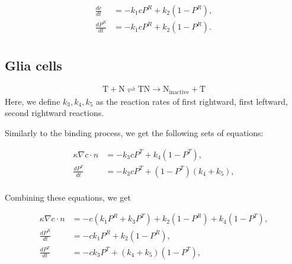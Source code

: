 \documentclass[11pt, a4paper]{article}\usepackage[]{graphicx}\usepackage[]{color}
\begin{document}
\begin{align*}
\frac{dc}{dt} &= -k_1cP^R + k_2(1-P^R),\\
\frac{dP^R}{dt} &= -k_1cP^R + k_2(1-P^R).\\
\end{align*}


\subsection{Glia cells}


\begin{align*}
\text{T} + \text{N} \rightleftharpoons \text{TN} \rightarrow \text{N}_{\text{inactive}} + \text{T}
\end{align*}
Here, we define $k_3, k_4, k_5$ as the reaction rates of first rightward, first leftward, second rightward reactions.

Similarly to the binding process, we get the following sets of equations:

\begin{align*}
\kappa \nabla c \cdot n &= -k_3c P^T + k_4(1-P^T),\\
\frac{dP^T}{dt} &= -k_3c P^T + (1-P^T)(k_4 + k_5),\\
\end{align*}


Combining these equations, we get

\begin{align*}
\kappa \nabla c \cdot n &= -c(k_1 P^R + k_3 P^T) + k_2 (1-P^R) + k_4 (1-P^T)    ,\\
\frac{dP^R}{dt} &= -ck_1 P^R + k_2(1-P^R),\\
\frac{dP^T}{dt} &= -ck_3 P^T + (k_4 + k_5)(1-P^T),\\
\end{align*}
\end{document}
